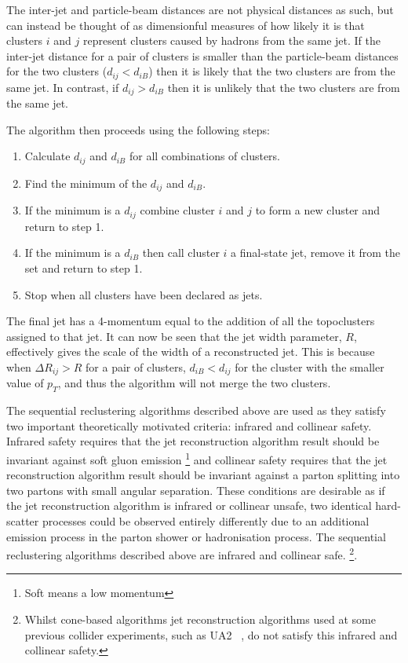 The inter-jet and particle-beam distances are not physical distances as such, but can instead be thought of as dimensionful measures of how likely it is that
clusters $i$ and $j$ represent clusters caused by hadrons from the same jet.
If the inter-jet distance for a pair of clusters is smaller than the particle-beam distances for the two clusters ($d_{ij} < d_{iB}$) 
then it is likely that the two clusters are from the same jet. 
In contrast, if $d_{ij} > d_{iB}$ then it is unlikely that the two clusters are from the same jet.
 
\noindent The algorithm then proceeds using the following steps:
\vspace{-1em}
\begin{enumerate}[nolistsep]
  \item Calculate $d_{ij}$ and $d_{iB}$ for all combinations of clusters.  
  \item Find the minimum of the $d_{ij}$ and $d_{iB}$. 
  \item If the minimum is a $d_{ij}$ combine cluster $i$ and $j$ to form a new cluster and return to step 1. 
  \item If the minimum is a $d_{iB}$ then call cluster $i$ a final-state jet, remove it from the set and return to step 1.  
  \item Stop when all clusters have been declared as jets. 
\end{enumerate} 
The final jet has a 4-momentum equal to the addition of all the topoclusters assigned to that jet.
It can now be seen that the jet width parameter, $R$, effectively gives the scale of the width of a reconstructed jet.
This is because when $\Delta R_{ij} > R$ for a pair of clusters,
$d_{iB} < d_{ij}$ for the cluster with the smaller value of ${p_T}$,
and thus the algorithm will not merge the two clusters.

The sequential reclustering algorithms described above are used as they satisfy two important theoretically motivated criteria:
infrared and collinear safety.
Infrared safety requires that the jet reconstruction algorithm result should be invariant against soft gluon emission \footnote{Soft means a low momentum}
and collinear safety requires that the jet reconstruction algorithm result should be invariant against a parton splitting into two partons with small angular separation.
These conditions are desirable as if the jet reconstruction algorithm is infrared or collinear unsafe,
two identical hard-scatter processes could be observed entirely differently due to an additional emission process in the parton shower or hadronisation process.
The sequential reclustering algorithms described above are infrared and collinear safe.
\footnote{Whilst cone-based algorithms jet reconstruction algorithms used at some previous collider experiments,
  such as UA2 ~\cite{obj-jets_reco_UA2}, do not satisfy this infrared and collinear safety.}.

